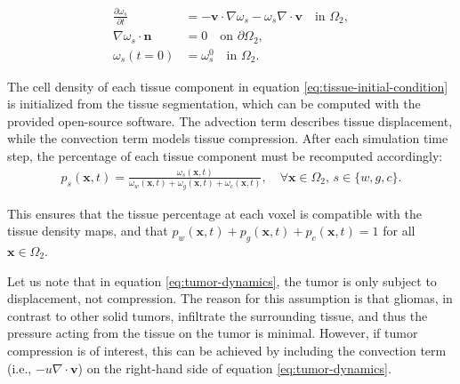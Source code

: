 \documentclass[12pt]{article}
\newcommand{\bn}{\mathbf{n}}
\newcommand{\bv}{\mathbf{v}}
\newcommand{\bx}{\mathbf{x}}
\begin{document}
\begin{align}
    \frac{\partial \omega_s}{\partial t} &= -\bv \cdot \nabla \omega_s - \omega_s \nabla \cdot \bv \quad \text{in } \Omega_2, \label{eq:tissue-dynamics} \\
    \nabla \omega_s \cdot \bn &= 0 \quad \text{on } \partial \Omega_2, \label{eq:tissue-boundary} \\
    \omega_s(t=0) &= \omega_s^0 \quad \text{in } \Omega_2. \label{eq:tissue-initial-condition}
\end{align}

The cell density of each tissue component in equation \eqref{eq:tissue-initial-condition} is initialized from the tissue segmentation, which can be computed with the provided open-source software. The advection term describes tissue displacement, while the convection term models tissue compression. After each simulation time step, the percentage of each tissue component must be recomputed accordingly:
\begin{align}
    p_s(\bx, t) = \frac{\omega_s(\bx, t)}{\omega_w(\bx, t) + \omega_g(\bx, t) + \omega_c(\bx, t)} , \quad \forall \bx \in \Omega_2, \, s \in \{w, g, c\}.
\end{align}

This ensures that the tissue percentage at each voxel is compatible with the tissue density maps, and that \( p_w(\bx, t) + p_g(\bx, t) + p_c(\bx, t) = 1 \) for all \( \bx \in \Omega_2 \).

Let us note that in equation \eqref{eq:tumor-dynamics}, the tumor is only subject to displacement, not compression. The reason for this assumption is that gliomas, in contrast to other solid tumors, infiltrate the surrounding tissue, and thus the pressure acting from the tissue on the tumor is minimal. However, if tumor compression is of interest, this can be achieved by including the convection term (i.e., \(- u \nabla \cdot \bv\)) on the right-hand side of equation \eqref{eq:tumor-dynamics}.


% 

% 
\end{document}
